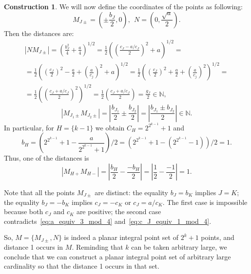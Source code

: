 \documentclass[a4paper,14pt]{article} %
\theoremstyle{plain}
\theoremstyle{definition}
\newtheorem{construction}[theorem]{Construction}
\begin{document}
\begin{construction}
	We will now define the coordinates of the points as following:
	\begin{equation}
		M_{J\pm} =\left(\pm\frac{b_J}{2}, 0\right)
		,
		~~
		N   =\left(0, \frac{\sqrt{a}}{2}\right)
		.
	\end{equation}
	Then the distances are:
	\begin{multline}
		|N M_{J\pm}|
		=
		\left(\frac{b_J^2}{4} + \frac{a}{4}\right)^{1/2}
		=
		\frac{1}{2}\left(\left(\frac{c_J - a/c_J}{2}\right)^2 + a\right)^{1/2}
		=
		\\=
		\frac{1}{2}\left( \left(\frac{c_J}{2}\right)^2 - \frac{a}{2} + \left(\frac{a}{c_j}\right)^2 + a\right)^{1/2}
		=
		\frac{1}{2}\left( \left(\frac{c_J}{2}\right)^2 + \frac{a}{2} + \left(\frac{a}{c_j}\right)^2    \right)^{1/2}
		=
		\\=
		\frac{1}{2}\left(\left(\frac{c_J + a/c_J}{2}\right)^2\right)^{1/2}
		=
		\frac{1}{2}\left(\frac{c_J + a/c_J}{2}\right)
		=
		\frac{g_J}{2}
		\in\mathbb{N}
		,
	\end{multline}
	\begin{equation}
		|M_{J_1 \pm}  M_{J_2 \pm}|
		=
		\left|\frac{b_{J_1}}{2} \pm \frac{b_{J_2}}{2}\right|
		=
		\left|\frac{b_{J_1} \pm b_{J_2}}{2}\right|
		\in\mathbb{N}
		.
	\end{equation}
	In particular, for $H = \{k-1\}$ we obtain $C_H = 2^{2^{k-1}}+1$ and
	\begin{equation}
		b_H =
		\left( 2^{2^{k-1}}+1 - \frac{a}{2^{2^{k-1}}+1} \right)/2
		=
		\left(2^{2^{k-1}}+1 - \left(  2^{2^{k-1}}-1 \right) \right)/2
		=
		1
		.
	\end{equation}
	Thus, one of the distances is
	\begin{equation}
		|M_{H+}  M_{H-}|
		=
		\left|\frac{b_{H}}{2} - \frac{-b_{H}}{2}\right|
		=
		\left|\frac{1}{2} - \frac{-1}{2}\right|
		= 1
		.
	\end{equation}

	Note that all the points $M_{J\pm}$ are distinct:
	the equality $b_J =  b_K$ implies $J=K$;
	the equality $b_J = -b_K$ implies $c_J = -c_K$ or $c_J = a / c_K$.
	The first case is impossible because both $c_J$ and $c_K$ are positive;
	the second case contradicts~\eqref{eq:a_equiv_3_mod_4} and~\eqref{eq:c_J_equiv_1_mod_4}.


	So, $M = \{ M_{J\pm}, N\}$ is indeed a planar integral point set of $2^k+1$ points,
	and distance 1 occurs in $M$.
	Reminding that $k$ can be taken arbitrary large, we conclude that we can construct
	a planar integral point set of arbitrary large cardinality so that the distance 1 occurs in that set.
\end{construction}
\end{document}
